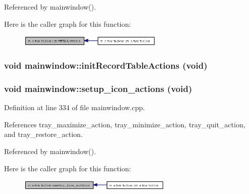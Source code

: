 Referenced by mainwindow().

Here is the caller graph for this function:\begin{figure}[H]
\begin{center}
\leavevmode
\includegraphics[width=195pt]{classmainwindow_c2cf8262152cac2a283474c3f42a22ac_icgraph}
\end{center}
\end{figure}
\subsubsection{\setlength{\rightskip}{0pt plus 5cm}void mainwindow::init\-Record\-Table\-Actions (void)\hspace{0.3cm}{\tt  [private]}}\label{classmainwindow_c745dbade81fb969eab44d79079e05b8}


\subsubsection{\setlength{\rightskip}{0pt plus 5cm}void mainwindow::setup\_\-icon\_\-actions (void)\hspace{0.3cm}{\tt  [private]}}\label{classmainwindow_bc75931596e1d8d8a796291258f9925d}




Definition at line 334 of file mainwindow.cpp.

References tray\_\-maximize\_\-action, tray\_\-minimize\_\-action, tray\_\-quit\_\-action, and tray\_\-restore\_\-action.

Referenced by mainwindow().

Here is the caller graph for this function:\begin{figure}[H]
\begin{center}
\leavevmode
\includegraphics[width=208pt]{classmainwindow_bc75931596e1d8d8a796291258f9925d_icgraph}
\end{center}
\end{figure}
